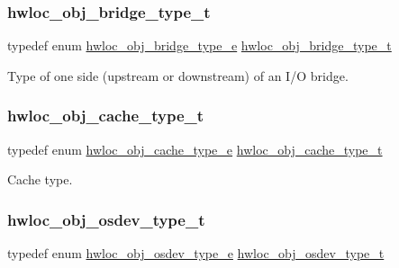 \subsubsection{\texorpdfstring{hwloc\+\_\+obj\+\_\+bridge\+\_\+type\+\_\+t}{hwloc\_obj\_bridge\_type\_t}}
{\footnotesize\ttfamily typedef enum \hyperlink{a00184_ga48a4803c72574191d7ead1c62aaf9860}{hwloc\+\_\+obj\+\_\+bridge\+\_\+type\+\_\+e}  \hyperlink{a00184_ga0a947e8c5adcc729b126bd09c01a0153}{hwloc\+\_\+obj\+\_\+bridge\+\_\+type\+\_\+t}}



Type of one side (upstream or downstream) of an I/O bridge. 

\mbox{\label{a00184_gab6e1e7efedae8b341f3ee14fbe53d66c}} 
\subsubsection{\texorpdfstring{hwloc\+\_\+obj\+\_\+cache\+\_\+type\+\_\+t}{hwloc\_obj\_cache\_type\_t}}
{\footnotesize\ttfamily typedef enum \hyperlink{a00184_ga791c9875c8fe20f3e1e5871e0657e59b}{hwloc\+\_\+obj\+\_\+cache\+\_\+type\+\_\+e}  \hyperlink{a00184_gab6e1e7efedae8b341f3ee14fbe53d66c}{hwloc\+\_\+obj\+\_\+cache\+\_\+type\+\_\+t}}



Cache type. 

\mbox{\label{a00184_ga90c1e82a60ba5871d07645169e636987}} 
\subsubsection{\texorpdfstring{hwloc\+\_\+obj\+\_\+osdev\+\_\+type\+\_\+t}{hwloc\_obj\_osdev\_type\_t}}
{\footnotesize\ttfamily typedef enum \hyperlink{a00184_ga64f5d539df299c97ae80ce53fc4b56c0}{hwloc\+\_\+obj\+\_\+osdev\+\_\+type\+\_\+e}  \hyperlink{a00184_ga90c1e82a60ba5871d07645169e636987}{hwloc\+\_\+obj\+\_\+osdev\+\_\+type\+\_\+t}}



